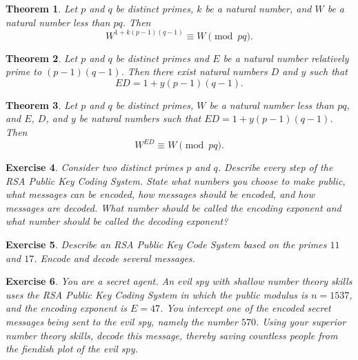\documentclass[11pt,leqno]{article}
\newtheorem{thm}{Theorem}[section]
\newtheorem{exer}[thm]{Exercise}
\theoremstyle{definition}
\begin{document}

\begin{thm}
Let $p$ and $q$ be distinct primes, $k$ be a natural number, and $W$
be a natural number less than $pq$. Then
\[W^{1+k(p-1)(q-1)}\equiv W\pmod{pq}.\]
\end{thm}

\begin{thm}
Let $p$ and $q$ be distinct primes and $E$ be a natural number
relatively prime to $(p-1)(q-1)$. Then there exist natural numbers
$D$ and $y$ such that
\[ED = 1+y(p-1)(q-1).\]
\end{thm}

\begin{thm}
Let $p$ and $q$ be distinct primes, $W$ be a natural number less
than $pq$, and $E$, $D$, and $y$ be natural numbers such that
$ED=1+y(p-1)(q-1)$. Then
\[W^{ED}\equiv W\pmod{pq}.\]
\end{thm}

\begin{exer}
Consider two distinct primes $p$ and $q$. Describe every step of the
RSA Public Key Coding System. State what numbers you choose to make
public, what messages can be encoded, how messages should be
encoded, and how messages are decoded.  What number should be called
the \textit{encoding exponent} and what number should be called the
\textit{decoding exponent}?
\end{exer}

\begin{exer}
Describe an RSA Public Key Code System based on the primes $11$ and
$17$.  Encode and decode several messages.
\end{exer}

\begin{exer}
You are a secret agent. An evil spy with shallow number theory
skills uses the RSA Public Key Coding System in which the public
modulus is $n=1537$, and the encoding exponent is $E=47$. You
intercept one of the encoded secret messages being sent to the evil
spy, namely the number $570$. Using your superior number theory
skills, decode this message, thereby saving countless people from
the fiendish plot of the evil spy.
\end{exer}
\end{document}
